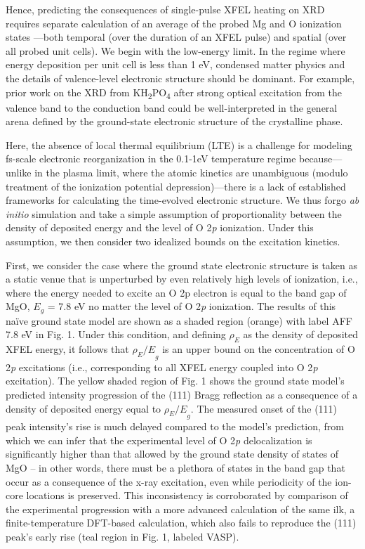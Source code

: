 Hence, predicting the consequences of single-pulse XFEL heating on XRD
requires separate calculation of an average of the probed Mg and O
ionization states ---both temporal (over the duration of an XFEL pulse)
and spatial (over all probed unit cells). We begin with the low-energy
limit. In the regime where energy deposition per unit cell is less than
1 eV, condensed matter physics and the details of valence-level
electronic structure should be dominant. For example, prior work on the
XRD from KH\textsubscript{2}PO\textsubscript{4} after strong optical
excitation from the valence band to the conduction band could be
well-interpreted in the general arena defined by the ground-state
electronic structure of the crystalline phase. \cite{ZAMPONI2012ULTRAFAST}

Here, the absence of local thermal equilibrium (LTE) is a challenge for
modeling fs-scale electronic reorganization in the 0.1-1eV temperature
regime because---unlike in the plasma limit, where the atomic kinetics
are unambiguous (modulo treatment of the ionization potential
depression)---there is a lack of established frameworks for calculating
the time-evolved electronic structure. We thus forgo \emph{ab initio}
simulation and take a simple assumption of proportionality between the
density of deposited energy and the level of O 2\emph{p} ionization.
Under this assumption, we then consider two idealized bounds on the
excitation kinetics.

First, we consider the case where the ground state electronic structure
is taken as a static venue that is unperturbed by even relatively high
levels of ionization, i.e., where the energy needed to excite an O 2p
electron is equal to the band gap of MgO, \(E_{g}\) = 7.8 eV no matter
the level of O 2\emph{p} ionization. The results of this naïve ground
state model are shown as a shaded region (orange) with label AFF 7.8 eV
in Fig. 1. Under this condition, and defining \(\rho_{E}\) as the
density of deposited XFEL energy, it follows that \({\rho_{E}/E}_{g}\)
is an upper bound on the concentration of O 2\emph{p} excitations (i.e.,
corresponding to all XFEL energy coupled into O 2\emph{p} excitation).
The yellow shaded region of Fig. 1 shows the ground state model's
predicted intensity progression of the (111) Bragg reflection as a
consequence of a density of deposited energy equal to
\({\rho_{E}/E}_{g}.\) The measured onset of the (111) peak intensity's
rise is much delayed compared to the model's prediction, from which we
can infer that the experimental level of O 2\emph{p} delocalization is
significantly higher than that allowed by the ground state density of
states of MgO -- in other words, there must be a plethora of states in
the band gap that occur as a consequence of the x-ray excitation, even
while periodicity of the ion-core locations is preserved. This
inconsistency is corroborated by comparison of the experimental
progression with a more advanced calculation of the same ilk, a
finite-temperature DFT-based calculation, which also fails to reproduce
the (111) peak's early rise (teal region in Fig. 1, labeled VASP).

